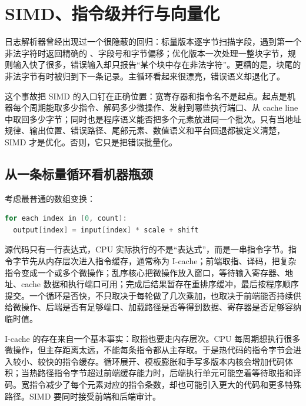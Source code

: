 \chapter{SIMD、指令级并行与向量化}

日志解析器曾经出现过一个很隐蔽的回归：标量版本逐字节扫描字段，遇到第一个非法字符时返回精确的 、字段号和字节偏移；优化版本一次处理一整块字节，规则输入快了很多，错误输入却只报告“某个块中存在非法字符”。更糟的是，块尾的非法字节有时被归到下一条记录。主循环看起来很漂亮，错误语义却退化了。

这个事故把 SIMD 的入口钉在正确位置：宽寄存器和指令名不是起点。起点是机器每个周期能取多少指令、解码多少微操作、发射到哪些执行端口、从 cache line 中取回多少字节；同时也是程序语义能否把多个元素放进同一个批次。只有当地址规律、输出位置、错误路径、尾部元素、数值语义和平台回退都被定义清楚，SIMD 才是优化。否则，它只是把错误批量化。

\section{从一条标量循环看机器瓶颈}

考虑最普通的数组变换：

\begin{lstlisting}[language=C++,caption={标量一对一变换的语义骨架}]
for each index in [0, count):
  output[index] = input[index] * scale + shift
\end{lstlisting}

源代码只有一行表达式，CPU 实际执行的不是“表达式”，而是一串指令字节。指令字节先从内存层次进入指令缓存，通常称为 I-cache；前端取指、译码，把复杂指令变成一个或多个微操作；乱序核心把微操作放入窗口，等待输入寄存器、地址、cache 数据和执行端口可用；完成后结果暂存在重排序缓冲，最后按程序顺序提交。一个循环是否快，不只取决于每轮做了几次乘加，也取决于前端能否持续供给微操作、后端是否有足够端口、加载路径是否等得到数据、寄存器是否足够容纳临时值。

I-cache 的存在来自一个基本事实：取指也要走内存层次。CPU 每周期想执行很多微操作，但主存距离太远，不能每条指令都从主存取。于是热代码的指令字节会进入较小、较快的指令缓存。循环展开、模板膨胀和手写多版本内核会增加代码体积；当热路径指令字节超过前端缓存能力时，后端执行单元可能空着等待取指和译码。宽指令减少了每个元素对应的指令条数，却也可能引入更大的代码和更多特殊路径。SIMD 要同时接受前端和后端审计。

